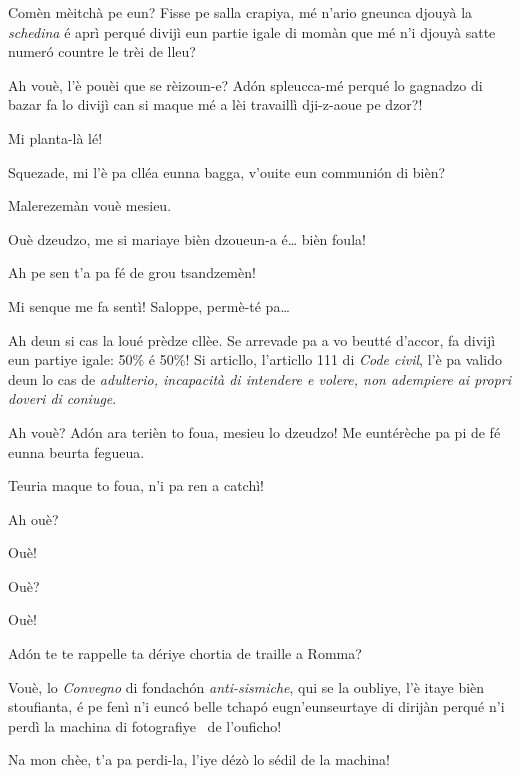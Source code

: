 \begin{drama}
\Tobiespeaks Comèn mèitchà pe eun? Fisse pe salla crapiya, mé n’ario gneun\-ca djouyà la \textit{schedina} é aprì perqué divijì eun partie igale di momàn que mé n'i djouyà satte numer\'o countre le trèi de lleu?

\Bertinaspeaks Ah vouè, l’è pouèi que se rèizoun-e? Ad\'on spleucca-mé perqué lo gagnadzo di bazar fa lo divijì can si maque mé a lèi travaillì dji-z-aoue pe dzor?!

\Tobiespeaks Mi planta-là lé!

\DzeudzoSenliquerspeaks {} Squezade, mi l’è pa cllé\-a eun\-na bagga, v'ouite eun communión di bièn?

\Tobiespeaks Malerezemàn vouè mesieu.

\Bertinaspeaks Ouè dzeudzo, me si mariaye bièn dzoueun-a é\ldots {} bièn foula!

\Tobiespeaks Ah pe sen t’a pa fé de grou tsandzemèn!

\Bertinaspeaks Mi senque me fa sentì! Saloppe, permè-té pa\ldots

\DzeudzoSenliquerspeaks {} Ah deun si cas la loué prèdze cllèe. Se arrevade pa a vo beutté d’accor, fa divijì eun partiye igale: 50$\%$ é 50$\%$! Si articllo, l’articllo 111 di \textit{Code civil}, l’è pa valido deun lo cas de  \og \textit{adulterio, incapacità di intendere e volere, non adempiere ai propri doveri di coniuge}\fg .

\Bertinaspeaks Ah vouè? Adón ara terièn to foua, mesieu lo dzeudzo! Me euntérèche pa pi de fé eunna beurta fegueua.

\Tobiespeaks Teuria maque to foua, n’i pa ren a catchì!

\Bertinaspeaks Ah ouè?

\Tobiespeaks Ouè!

\Bertinaspeaks Ouè?

\Tobiespeaks Ouè!

\Bertinaspeaks Ad\'on te te rappelle ta dériye chortia de traille a Romma?

\Tobiespeaks Vouè, lo \textit{Convegno} di fondachón \textit{anti-sismiche}, qui se la oubliye, l’è itaye bièn stoufianta, é pe fenì n’i eunc\'o belle tchap\'o eugn’eunseurtaye di dirijàn perqué n’i perdì la machina di fotografiye \macchinaFoto\ de l’ouficho!

\Bertinaspeaks Na mon chèe, t’a pa perdi-la, l'iye dézò lo sédil de la machina!


\end{drama}

